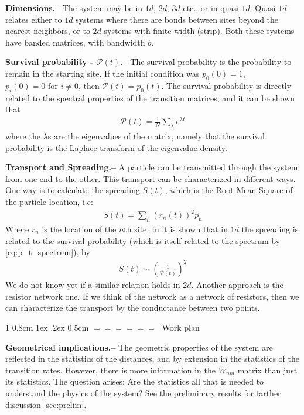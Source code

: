 \documentclass[onecolumn,fleqn,notitlepage,secnumarabic]{revtex4}
\makeatletter
\def\section{%
  \@startsection
    {section}%
    {1}%
    {\z@}%
    {0.8cm \@plus1ex \@minus .2ex}%
    {0.5cm}%
    {\Large\bf $=\!=\!=\!=\!=\!=\;$}%
}%
\makeatother
\begin{document}
{ \bf Dimensions.-- } The system may be in $1d$, $2d$, $3d$ etc., or in quasi-$1d$. Quasi-$1d$ relates either to $1d$ systems where there are bonds between sites beyond the nearest neighbors, or to $2d$ systems with finite width (strip). Both these systems have banded matrices, with bandwidth $b$.

{ \bf Survival probability - $\mathcal{P}(t)$.--} 
The survival probability is the probability to remain in the starting site. If the initial condition was $p_0(0)=1$, $p_i(0)=0 \textrm{  for  } i\neq 0$, then $\mathcal{P}(t)= p_0(t)$. The survival probability is directly related to the spectral properties of the transition matrices, and it can be shown that 
\begin{align} \label{eq:p_t_spectrum}
\mathcal{P}(t) = \frac{1}{N}\sum_\lambda e^{\lambda t}
\end{align}
where the $\lambda$s are the eigenvalues of the matrix, namely that the survival probability is the Laplace transform of the eigenvalue density.

{ \bf Transport and Spreading.--}  %
A particle can be transmitted through the system from one end to the other. This transport can be characterized in different ways. One way is to calculate the spreading $S(t)$, which is the Root-Mean-Square of the particle location, i.e:
\begin{align}
  S(t) = \sum_n (r_n(t)  )^2 p_n  %
\end{align}
Where $r_n$ is the location of the $n$th site. In \cite{Alexander:1981:RMP} it is shown that in $1d$ the spreading is related to the survival probability (which is itself related to the spectrum by \eqref{eq:p_t_spectrum}), by
\begin{align}
S(t)\sim \left(\frac{1}{\mathcal{P}(t)}\right)^2
\end{align}
We do not know yet if a similar relation holds in $2d$. Another approach is the resistor network one. If we think of the network as a network of resistors, then we can characterize the transport by the conductance between two points. 

\section{Work plan}


{ \bf Geometrical implications.-- } The geometric properties of the system are reflected in the statistics of the distances, and by extension in the statistics of the transition rates. However, there is more information in the $W_{nm}$ matrix than just its statistics. The question arises: Are the statistics all that is needed to understand the physics of the system? See the preliminary results for farther discussion \ref{sec:prelim}.
\end{document}
